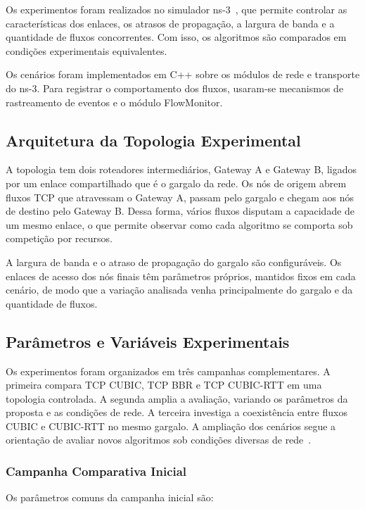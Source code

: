 \documentclass[a4paper,12pt]{monografia}
\begin{document}
Os experimentos foram realizados no simulador ns-3~\cite{ns3}, que permite controlar as características dos enlaces, os atrasos de propagação, a largura de banda e a quantidade de fluxos concorrentes. Com isso, os algoritmos são comparados em condições experimentais equivalentes.

Os cenários foram implementados em C++ sobre os módulos de rede e transporte do ns-3. Para registrar o comportamento dos fluxos, usaram-se mecanismos de rastreamento de eventos e o módulo FlowMonitor.

\subsection{Arquitetura da Topologia Experimental}

A topologia tem dois roteadores intermediários, Gateway A e Gateway B, ligados por um enlace compartilhado que é o gargalo da rede. Os nós de origem abrem fluxos TCP que atravessam o Gateway A, passam pelo gargalo e chegam aos nós de destino pelo Gateway B. Dessa forma, vários fluxos disputam a capacidade de um mesmo enlace, o que permite observar como cada algoritmo se comporta sob competição por recursos.

A largura de banda e o atraso de propagação do gargalo são configuráveis. Os enlaces de acesso dos nós finais têm parâmetros próprios, mantidos fixos em cada cenário, de modo que a variação analisada venha principalmente do gargalo e da quantidade de fluxos.

\subsection{Parâmetros e Variáveis Experimentais}

Os experimentos foram organizados em três campanhas complementares. A primeira compara TCP CUBIC, TCP BBR e TCP CUBIC-RTT em uma topologia controlada. A segunda amplia a avaliação, variando os parâmetros da proposta e as condições de rede. A terceira investiga a coexistência entre fluxos CUBIC e CUBIC-RTT no mesmo gargalo. A ampliação dos cenários segue a orientação de avaliar novos algoritmos sob condições diversas de rede~\cite{rfc9743}.

\subsubsection{Campanha Comparativa Inicial}

Os parâmetros comuns da campanha inicial são:
\end{document}
